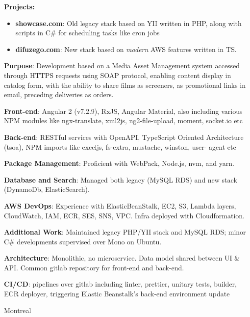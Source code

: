 \documentclass[
  a4paper,
   maincolor=cvblue,
   sectioncolor=cvblue,
   sidebarwidth=0.323\paperwidth,
]{fortysecondscv}
\begin{document}
\begin{cvtableNew}
{        \vspace{0.1pt} %
        \textbf{Projects:}
        \begin{itemize}[itemsep=1mm, topsep=5pt, leftmargin=8pt]
          \item \textbf{showcase.com}: Old legacy stack based on YII written in PHP, along with scripts in C\# for scheduling tasks like cron jobs
          \item \textbf{difuzego.com}: New stack based on \textit{modern} AWS features written in TS.
        \end{itemize}

        \vspace{4pt} %
        \textbf{Purpose}: Development based on a Media Asset Management system accessed through HTTPS requests using SOAP protocol, enabling content display in catalog form, with the ability to share films as screeners, as promotional links in email, preceding deliveries as orders.\vspace{5pt}

        \textbf{Front-end}: Angular 2 (v7.2.9), RxJS, Angular Material, also including various NPM modules like ngx-translate, xml2js, ng2-file-upload, moment, socket.io etc\vspace{5pt}

        \textbf{Back-end}: RESTful services with OpenAPI, TypeScript Oriented Architecture (tsoa), NPM imports like exceljs, fs-extra, mustache, winston, user-
        agent etc\vspace{5pt}

        \textbf{Package Management}: Proficient with WebPack, Node.js, nvm, and yarn.\vspace{5pt}

        \textbf{Database and Search}: Managed both legacy (MySQL RDS) and new stack (DynamoDb, ElasticSearch).\vspace{5pt}

        \textbf{AWS DevOps}: Experience with ElasticBeanStalk, EC2, S3, Lambda layers, CloudWatch, IAM, ECR, SES, SNS, VPC. Infra deployed with Cloudformation.\vspace{5pt}

        \textbf{Additional Work}: Maintained legacy PHP/YII stack and MySQL RDS; minor C\# developments supervised over Mono on Ubuntu.\vspace{5pt}

        \textbf{Architecture}: Monolithic, no microservice. Data model shared between UI \& API. Common gitlab repository for front-end and back-end.\vspace{5pt}

        \textbf{CI/CD}: pipelines over gitlab including linter, prettier, unitary tests, builder, ECR deployer, triggering Elastic Beanstalk's back-end environment update
      }
    {Montreal} %
\end{cvtableNew}
\end{document}
